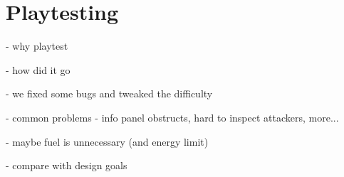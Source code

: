 \chapter{Playtesting}

- why playtest

- how did it go

- we fixed some bugs and tweaked the difficulty

- common problems - info panel obstructs, hard to inspect attackers, more...

- maybe fuel is unnecessary (and energy limit)

- compare with design goals

